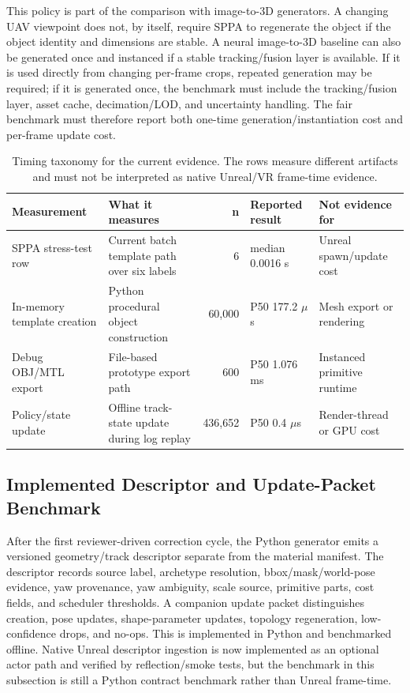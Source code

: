 ﻿\documentclass[11pt,a4paper]{article}
\begin{document}
This policy is part of the comparison with image-to-3D generators. A changing
UAV viewpoint does not, by itself, require SPPA to regenerate the object if the
object identity and dimensions are stable. A neural image-to-3D baseline can
also be generated once and instanced if a stable tracking/fusion layer is
available. If it is used directly from changing per-frame crops, repeated
generation may be required; if it is generated once, the benchmark must include
the tracking/fusion layer, asset cache, decimation/LOD, and uncertainty handling.
The fair benchmark must therefore report both one-time generation/instantiation
cost and per-frame update cost.


\begin{table}[h]
\centering
\scriptsize
\setlength{\tabcolsep}{2.5pt}
\caption{Timing taxonomy for the current evidence. The rows measure different
artifacts and must not be interpreted as native Unreal/VR frame-time evidence.}
\label{tab:timing-taxonomy}
\begin{tabular}{@{}p{3.1cm}p{4.2cm}r p{2.5cm}p{3.0cm}@{}}
\toprule
Measurement & What it measures & n & Reported result & Not evidence for \\
\midrule
SPPA stress-test row & Current batch template path over six labels & 6 & median 0.0016 s & Unreal spawn/update cost \\
In-memory template creation & Python procedural object construction & 60,000 & P50 177.2 \(\mu\)s & Mesh export or rendering \\
Debug OBJ/MTL export & File-based prototype export path & 600 & P50 1.076 ms & Instanced primitive runtime \\
Policy/state update & Offline track-state update during log replay & 436,652 & P50 0.4 \(\mu\)s & Render-thread or GPU cost \\
\bottomrule
\end{tabular}
\end{table}

\subsection{Implemented Descriptor and Update-Packet Benchmark}

After the first reviewer-driven correction cycle, the Python generator emits a
versioned geometry/track descriptor separate from the material manifest. The
descriptor records source label, archetype resolution, bbox/mask/world-pose
evidence, yaw provenance, yaw ambiguity, scale source, primitive parts, cost
fields, and scheduler thresholds. A companion update packet distinguishes
creation, pose updates, shape-parameter updates, topology regeneration,
low-confidence drops, and no-ops. This is implemented in Python and benchmarked
offline. Native Unreal descriptor ingestion is now implemented as an optional
actor path and verified by reflection/smoke tests, but the benchmark in this
subsection is still a Python contract benchmark rather than Unreal frame-time.
\end{document}
